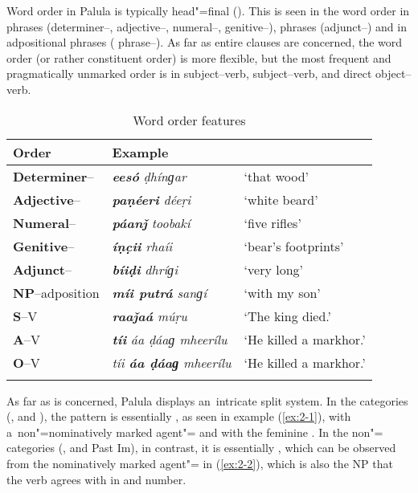 Word order in Palula is typically head"=final (). This is seen in the word order in  phrases (determiner--, adjective--, numeral--, genitive--),  phrases (adjunct--) and in adpositional phrases ( phrase--). As far as entire clauses are concerned, the word order (or rather constituent order) is more flexible, but the most frequent and pragmatically unmarked order is in subject--verb,  subject--verb, and direct object--verb.


\begin{table}[ht]
\caption{Word order features}
\begin{tabularx}{\textwidth}{ l l Q }
\lsptoprule
Order &
Example\\\midrule
\textbf{Determiner}-- &
\textit{\textbf{eesó} ḍhínɡar} &
`that wood' \\
\textbf{Adjective}-- &
\textit{\textbf{paṇéeri} déeṛi} &
`white beard' \\
\textbf{Numeral}-- &
\textit{\textbf{páanǰ} toobakí} &
`five rifles'\\
\textbf{Genitive}-- &
\textit{\textbf{íṇc̣ii} rhaíi} &
`bear's footprints'\\
\textbf{Adjunct}-- &
\textit{\textbf{bíiḍi} dhríɡi} &
`very long'\\
\textbf{NP}--adposition &
\textit{\textbf{míi putrá} sanɡí} &
`with my son'\\
\textbf{S}--V &
\textit{\textbf{raaǰaá} múṛu} &
`The king died.'\\
\textbf{A}--V &
\textit{\textbf{tíi} áa ḍáaɡ mheerílu} &
`He killed a markhor.' \\
\textbf{O}--V &
\textit{tíi \textbf{áa ḍáaɡ} mheerílu} &
`He killed a markhor.' 
\\\lspbottomrule
\end{tabularx}
\label{tab:2-worder}
\end{table}


As far as  is concerned, Palula displays an~intricate split system. In the  categories (,  and ), the pattern is essentially , as seen in example (\ref{ex:2-1}), with a~non"=nominatively marked agent"= and  with the feminine . In the non"= categories (,  and Past Im), in contrast, it is essentially , which can be observed from the nominatively marked agent"= in (\ref{ex:2-2}), which is also the NP that the  verb agrees with in  and number.

